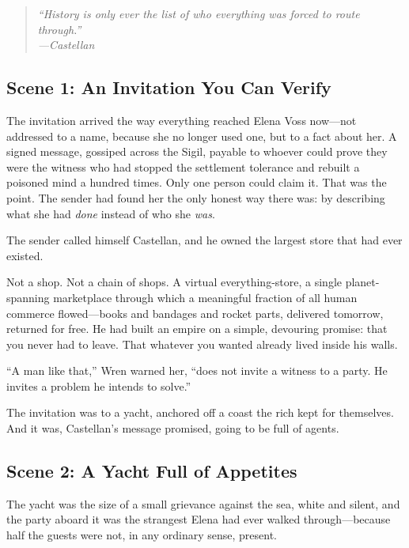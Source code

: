 \documentclass[12pt,letterpaper]{book}
\begin{document}
\begin{quote}
\itshape ``History is only ever the list of who everything was forced to route
through.''\\
\normalfont\hfill---Castellan
\end{quote}

\hypertarget{scene-1-an-invitation-you-can-verify}{%
\subsection{Scene 1: An Invitation You Can
Verify}\label{scene-1-an-invitation-you-can-verify}}

The invitation arrived the way everything reached Elena Voss now---not addressed
to a name, because she no longer used one, but to a fact about her. A signed
message, gossiped across the Sigil, payable to whoever could prove they were the
witness who had stopped the settlement tolerance and rebuilt a poisoned mind a
hundred times. Only one person could claim it. That was the point. The sender had
found her the only honest way there was: by describing what she had \emph{done}
instead of who she \emph{was}.

The sender called himself Castellan, and he owned the largest store that had ever
existed.

Not a shop. Not a chain of shops. A virtual everything-store, a single
planet-spanning marketplace through which a meaningful fraction of all human
commerce flowed---books and bandages and rocket parts, delivered tomorrow,
returned for free. He had built an empire on a simple, devouring promise: that you
never had to leave. That whatever you wanted already lived inside his walls.

``A man like that,'' Wren warned her, ``does not invite a witness to a party. He
invites a problem he intends to solve.''

The invitation was to a yacht, anchored off a coast the rich kept for themselves.
And it was, Castellan's message promised, going to be full of agents.

\hypertarget{scene-2-a-yacht-full-of-appetites}{%
\subsection{Scene 2: A Yacht Full of
Appetites}\label{scene-2-a-yacht-full-of-appetites}}

The yacht was the size of a small grievance against the sea, white and silent, and
the party aboard it was the strangest Elena had ever walked through---because half
the guests were not, in any ordinary sense, present.
\end{document}

